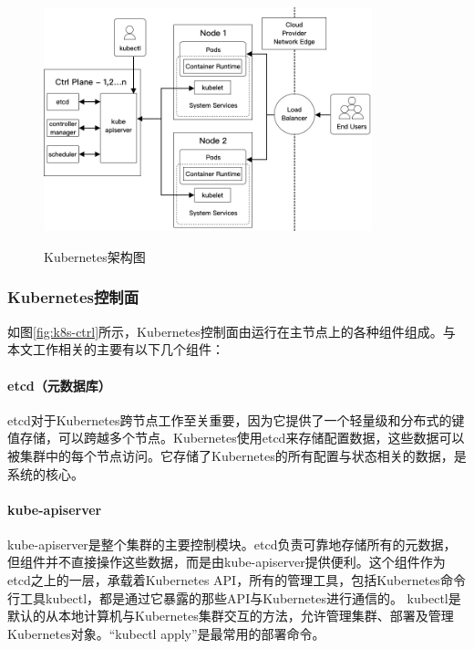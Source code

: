 \documentclass[macfonts,master]{njuthesis}
\begin{document}
\begin{figure}[htbp]
  \centering
  \includegraphics[width=0.85\textwidth]{pics/Kubernetes-architecture.png}\\
  \caption{Kubernetes架构图}\label{fig:k8s-arch}
\end{figure}

\subsubsection{Kubernetes控制面}
如图\ref{fig:k8s-ctrl}所示，Kubernetes控制面由运行在主节点上的各种组件组成。与本文工作相关的主要有以下几个组件：

\paragraph{etcd（元数据库）}

etcd对于Kubernetes跨节点工作至关重要，因为它提供了一个轻量级和分布式的键值存储，可以跨越多个节点。Kubernetes使用etcd来存储配置数据，这些数据可以被集群中的每个节点访问。它存储了Kubernetes的所有配置与状态相关的数据，是系统的核心。

\paragraph{kube-apiserver}
kube-apiserver是整个集群的主要控制模块。etcd负责可靠地存储所有的元数据，但组件并不直接操作这些数据，而是由kube-apiserver提供便利。这个组件作为etcd之上的一层，承载着Kubernetes API，所有的管理工具，包括Kubernetes命令行工具kubectl，都是通过它暴露的那些API与Kubernetes进行通信的。 kubectl是默认的从本地计算机与Kubernetes集群交互的方法，允许管理集群、部署及管理Kubernetes对象。``kubectl apply''是最常用的部署命令。
\end{document}

